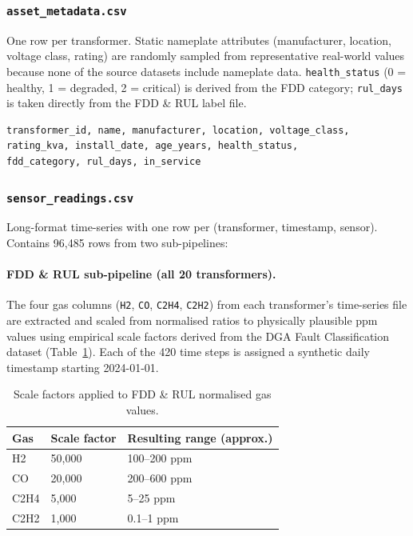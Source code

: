 \subsubsection{\texttt{asset\_metadata.csv}}

One row per transformer.  Static nameplate attributes (manufacturer, location,
voltage class, rating) are randomly sampled from representative real-world
values because none of the source datasets include nameplate data.
\texttt{health\_status} (0 = healthy, 1 = degraded, 2 = critical) is derived
from the FDD category; \texttt{rul\_days} is taken directly from the FDD \& RUL
label file.

\begin{verbatim}
transformer_id, name, manufacturer, location, voltage_class,
rating_kva, install_date, age_years, health_status,
fdd_category, rul_days, in_service
\end{verbatim}

\subsubsection{\texttt{sensor\_readings.csv}}

Long-format time-series with one row per (transformer, timestamp, sensor).
Contains 96{,}485 rows from two sub-pipelines:

\paragraph{FDD \& RUL sub-pipeline (all 20 transformers).}
The four gas columns (\texttt{H2}, \texttt{CO}, \texttt{C2H4}, \texttt{C2H2})
from each transformer's time-series file are extracted and scaled from
normalised ratios to physically plausible ppm values using empirical scale
factors derived from the DGA Fault Classification dataset
(Table~\ref{tab:scale}).  Each of the 420 time steps is assigned a synthetic
daily timestamp starting 2024-01-01.

\begin{table}[h]
\centering
\caption{Scale factors applied to FDD \& RUL normalised gas values.}
\label{tab:scale}
\begin{tabular}{lll}
\hline
\textbf{Gas} & \textbf{Scale factor} & \textbf{Resulting range (approx.)} \\
\hline
H2   & 50{,}000 & 100–200 ppm \\
CO   & 20{,}000 & 200–600 ppm \\
C2H4 & 5{,}000  & 5–25 ppm \\
C2H2 & 1{,}000  & 0.1–1 ppm \\
\hline
\end{tabular}
\end{table}

